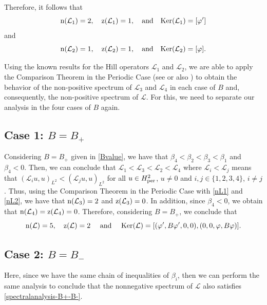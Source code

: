 \documentclass[10pt,reqno,a4paper]{amsart} %
\theoremstyle{definition} %
\numberwithin{equation}{section}
\numberwithin{figure}{section}
\begin{document}
Therefore, it follows that 
\begin{equation}\label{nL1}
    {\rm n}({\mathcal{L}}_1) = 2, \quad {\rm z}({\mathcal{L}}_1) = 1, \quad \text{and} \quad {\rm Ker}({\mathcal{L}}_1) = [\varphi']
\end{equation}
and
\begin{equation}\label{nL2}
    {\rm n}({\mathcal{L}}_2) = 1, \quad {\rm z}({\mathcal{L}}_2) = 1, \quad \text{and} \quad {\rm Ker}({\mathcal{L}}_2) = [\varphi].
\end{equation}

Using the known results for the Hill operators $\mathcal{L}_1$ and $\mathcal{L}_2$, we are able to apply the Comparison Theorem in the Periodic Case (see \cite[Theorem 2.2.2]{Eastham} or also \cite[Appendix]{Pastor}) to obtain the behavior of the non-positive spectrum of $\mathcal{L}_3$ and $\mathcal{L}_4$ in each case of $B$ and, consequently, the non-positive spectrum of $\mathcal{L}$. For this, we need to separate our analysis in the four cases of $B$ again.

\subsection*{Case 1: $B = B_+$} Considering $B = B_+$ given in \eqref{Bvalue}, we have that $\beta_4 < \beta_2 < \beta_3 < \beta_1$ and $\beta_4 < 0$. Then, we can conclude that $\mathcal{L}_1 < \mathcal{L}_3 < \mathcal{L}_2 < \mathcal{L}_4$ where $\mathcal{L}_i < \mathcal{L}_j$ means that $(\mathcal{L}_i u,u)_{L^2} < (\mathcal{L}_j u,u)_{L^2}$ for all $u \in H^2_{\rm per}$, $u \neq 0$ and $i,j \in \{1,2,3,4\}$, $i \neq j$. Thus, using the Comparison Theorem in the Periodic Case with \eqref{nL1} and \eqref{nL2}, we have that ${\rm n}(\mathcal{L}_3) = 2$ and ${\rm z}(\mathcal{L}_3) = 0$. In addition, since $\beta_4 < 0$, we obtain that ${\rm n}(\mathcal{L}_4) = {\rm z}(\mathcal{L}_4) = 0$. Therefore, considering $B = B_+$, we conclude that 
\begin{equation}\label{spectralanalysis-B+-B-}
    {\rm n}(\mathcal{L}) = 5, \quad {\rm z}(\mathcal{L}) = 2 \quad \text{ and } \quad {\rm Ker}(\mathcal{L}) = [(\varphi', B\varphi',0,0), (0,0,\varphi,B\varphi)].
\end{equation}

\subsection*{Case 2: $B = B_-$} Here, since we have the same chain of inequalities of $\beta_i$, then we can perform the same analysis to conclude that the nonnegative spectrum of $\mathcal{L}$ also satisfies \eqref{spectralanalysis-B+-B-}.
\end{document}
